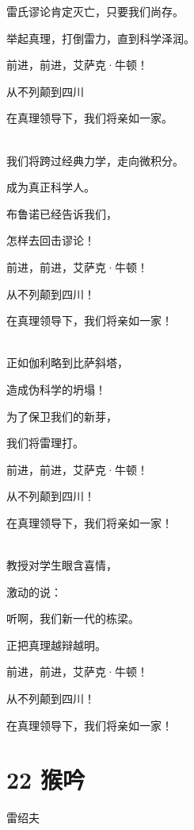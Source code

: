 \documentclass[UTF8,12pt,oneside]{ctexbook}
\begin{document}
    \begin{center}
        雷氏谬论肯定灭亡，只要我们尚存。
    
        举起真理，打倒雷力，直到科学泽润。
        
        前进，前进，艾萨克·牛顿！
        
        从不列颠到四川
        
        在真理领导下，我们将亲如一家。
        
        ~\\
        我们将跨过经典力学，走向微积分。
        
        成为真正科学人。
        
        布鲁诺已经告诉我们，
        
        怎样去回击谬论！
        
        前进，前进，艾萨克·牛顿！
        
        从不列颠到四川！
        
        在真理领导下，我们将亲如一家！
        
        ~\\
        正如伽利略到比萨斜塔，
        
        造成伪科学的坍塌！
        
        为了保卫我们的新芽，
        
        我们将雷理打。
        
        前进，前进，艾萨克·牛顿！
        
        从不列颠到四川！
        
        在真理领导下，我们将亲如一家！
        
        ~\\
        教授对学生眼含喜情，
        
        激动的说：
        
        听啊，我们新一代的栋梁。
        
        正把真理越辩越明。
        
        前进，前进，艾萨克·牛顿！
        
        从不列颠到四川！
        
        在真理领导下，我们将亲如一家！
        
    \end{center}
    
    \section{22 猴吟}
    \begin{center}    
        雷绍夫
    \end{center}
        
\end{document}
